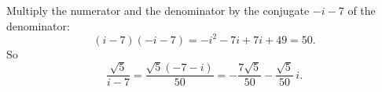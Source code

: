 Multiply the numerator and the denominator by the conjugate $-i-7$ of the denominator:
\[(i-7)(-i-7)=-i^2-7i+7i+49=50.\]
So
\[\dfrac{\sqrt5}{i-7}=\dfrac{\sqrt5(-7-i)}{50}=\boxed{-\dfrac{7\sqrt5}{50}-\dfrac{\sqrt5}{50}\,i}.\]
